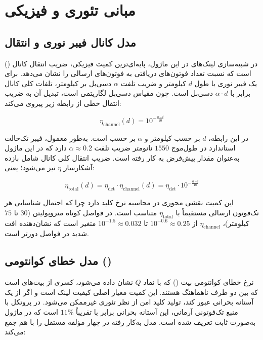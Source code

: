 \section{مبانی تئوری و فیزیکی}

\subsection{مدل کانال فیبر نوری و انتقال}

در شبیه‌سازی لینک‌های  در این ماژول، پایه‌ای‌ترین کمیت فیزیکی، ضریب انتقال کانال () است که نسبت تعداد فوتون‌های دریافتی به فوتون‌های ارسالی را نشان می‌دهد. برای یک فیبر نوری با طول $d$ کیلومتر و ضریب تلفت $\alpha$ دسی‌بل بر کیلومتر، تلفات کلی کانال برابر با $\alpha \cdot d$ دسی‌بل است. چون مقیاس دسی‌بل لگاریتمی است، تبدیل آن به ضریب انتقال خطی از رابطه زیر پیروی می‌کند:

\begin{equation}
	\eta_{\text{channel}}(d) = 10^{-\frac{\alpha \cdot d}{10}}
\end{equation}

در این رابطه، $d$ بر حسب کیلومتر و $\alpha$ بر حسب  است. به‌طور معمول، فیبر تک‌حالت استاندارد در طول‌موج $1550$ نانومتر ضریب تلفت $\alpha \approx 0.2$  دارد که در این ماژول به‌عنوان مقدار پیش‌فرض به کار رفته است. ضریب انتقال کلی کانال شامل بازده آشکارساز $\eta$ نیز می‌شود؛ یعنی:

\begin{equation}
	\eta_{\text{total}}(d) = \eta_{\text{det}} \cdot \eta_{\text{channel}}(d) = \eta_{\text{det}} \cdot 10^{-\frac{\alpha \cdot d}{10}}
\end{equation}

این کمیت نقشی محوری در محاسبه نرخ کلید دارد چرا که احتمال شناسایی هر تک‌فوتون ارسالی مستقیماً با $\eta_{\text{total}}$ متناسب است. در فواصل کوتاه متروپولیتن ($30$ تا $75$ کیلومتر)، $\eta_{\text{channel}}$ از $10^{-0.6} \approx 0.25$ تا $10^{-1.5} \approx 0.032$ متغیر است که نشان‌دهنده افت شدید در فواصل دورتر است.

\subsection{مدل خطای کوانتومی ()}

نرخ خطای کوانتومی بیت () که با نماد $Q$ نشان داده می‌شود، کسری از بیت‌های  است که بین دو طرف ناهماهنگ هستند. این کمیت معیار اصلی کیفیت لینک  است و اگر از یک آستانه بحرانی عبور کند، تولید کلید امن از نظر تئوری غیرممکن می‌شود. در پروتکل  با منبع تک‌فوتونی آرمانی، این آستانه بحرانی برابر با تقریباً $11\%$ است که در ماژول به‌صورت ثابت  تعریف شده است. مدل  به‌کار رفته در  چهار مؤلفه مستقل را با هم جمع می‌کند:

